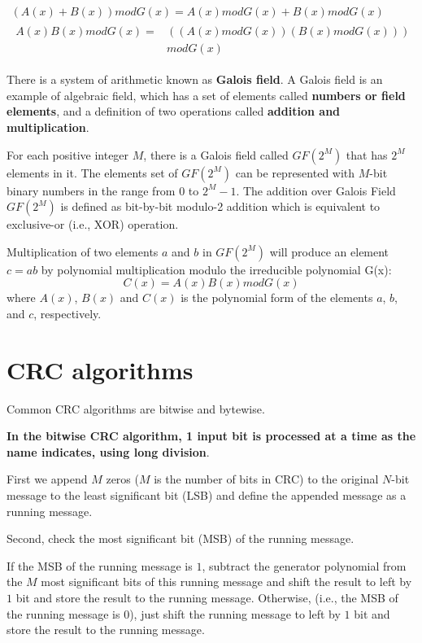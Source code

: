 \documentclass[fleqn]{IEEEtran}
\begin{document}
\begin{small}
\begin{gather}
   (A(x)+B(x))modG(x)=A(x)modG(x)+B(x)modG(x) \\
   \begin{split}
   A(x)B(x)modG(x)= & ((A(x)modG(x))(B(x)modG(x))) \\ & modG(x)
   \end{split}
\end{gather}
\end{small}

There is a system of arithmetic known as \textbf{Galois field}. 
A Galois field is an example of algebraic field, which has a set of elements 
called \textbf{numbers or field elements}, and a definition of two operations 
called \textbf{addition and multiplication}. 

For each positive integer $M$, there is a Galois field called $GF(2^{M})$ that 
has $2^{M}$ elements in it. The elements set of $GF(2^{M})$ can be
represented with $M$-bit binary numbers in the range from $0$ to 
$2^{M}-1$. The addition over Galois Field $GF(2^{M})$ is defined as bit-by-bit 
modulo-2 addition which is equivalent to exclusive-or (i.e., XOR) operation.

Multiplication of two elements $a$ 
and $b$ in $GF(2^{M})$ will produce an element $c=ab$ by polynomial 
multiplication modulo the irreducible polynomial G(x):
\[
   C(x)=A(x)B(x)modG(x)
\]
where $A(x)$, $B(x)$ and $C(x)$ is the polynomial form of the elements $a$, $b$, and $c$, 
respectively.


\section{CRC algorithms}
Common CRC algorithms are bitwise and bytewise. 

\textbf{In the bitwise CRC algorithm, 1 input bit is processed at a time as 
the name indicates, using long division}. 

First we append $M$ zeros ($M$ is the number of bits in CRC) to the original 
$N$-bit message to the least significant bit (LSB) and define the appended 
message as a running message. 

Second, check the most significant bit (MSB) of the running message. 

If the MSB of the running message is $1$, subtract the generator polynomial 
from the $M$ most significant bits of this running message and shift the result 
to left by $1$ bit and store the result to the running message. 
Otherwise, (i.e., the MSB of the running message is $0$), just shift the running 
message to left by $1$ bit and store the result to the running message. 
\end{document}
